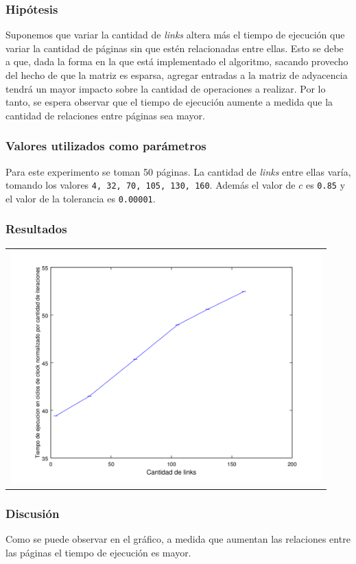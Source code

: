 			\subsubsection*{Hipótesis} 
			Suponemos que variar la cantidad de \emph{links} altera más el tiempo de ejecución que variar la cantidad de páginas sin que estén relacionadas entre ellas. Esto se debe a que, dada la forma en la que está implementado el algoritmo, sacando provecho del hecho de que la matriz es esparsa, agregar entradas a la matriz de adyacencia tendrá un mayor impacto sobre la cantidad de operaciones a realizar. Por lo tanto, se espera observar que el tiempo de ejecución aumente a medida que la cantidad de relaciones entre páginas sea mayor.

			\subsubsection*{Valores utilizados como parámetros} 		
			Para este experimento se toman 50 páginas. La cantidad de \emph{links} entre ellas varía, tomando los valores \texttt{4, 32, 70, 105, 130, 160}. Además el valor de $c$ es \texttt{0.85} y el valor de la tolerancia es \texttt{0.00001}. 
			
			\subsubsection*{Resultados}
				{\centering \begin{tabular}{c}
			      \includegraphics[width=12cm]{../../src/exp/graficos/exp2.png} \\
			    \end{tabular}}


			\subsubsection*{Discusión}
			Como se puede observar en el gráfico, a medida que aumentan las relaciones entre las páginas el tiempo de ejecución es mayor.  

